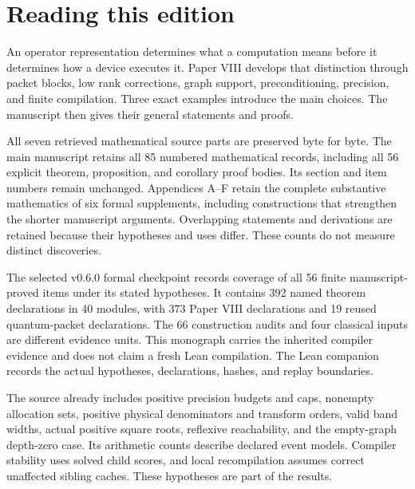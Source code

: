 \documentclass[11pt,letterpaper]{article}
\theoremstyle{definition}
\theoremstyle{remark}
\begin{document}
\KomorebiCover
{}

\section*{Reading this edition}
An operator representation determines what a computation means before it determines how a device executes it. Paper VIII develops that distinction through packet blocks, low rank corrections, graph support, preconditioning, precision, and finite compilation. Three exact examples introduce the main choices. The manuscript then gives their general statements and proofs.

All seven retrieved mathematical source parts are preserved byte for byte. The main manuscript retains all 85 numbered mathematical records, including all 56 explicit theorem, proposition, and corollary proof bodies. Its section and item numbers remain unchanged. Appendices A--F retain the complete substantive mathematics of six formal supplements, including constructions that strengthen the shorter manuscript arguments. Overlapping statements and derivations are retained because their hypotheses and uses differ. These counts do not measure distinct discoveries.

The selected v0.6.0 formal checkpoint records coverage of all 56 finite manuscript-proved items under its stated hypotheses. It contains 392 named theorem declarations in 40 modules, with 373 Paper VIII declarations and 19 reused quantum-packet declarations. The 66 construction audits and four classical inputs are different evidence units. This monograph carries the inherited compiler evidence and does not claim a fresh Lean compilation. The Lean companion records the actual hypotheses, declarations, hashes, and replay boundaries.

The source already includes positive precision budgets and caps, nonempty allocation sets, positive physical denominators and transform orders, valid band widths, actual positive square roots, reflexive reachability, and the empty-graph depth-zero case. Its arithmetic counts describe declared event models. Compiler stability uses solved child scores, and local recompilation assumes correct unaffected sibling caches. These hypotheses are part of the results.
\end{document}
